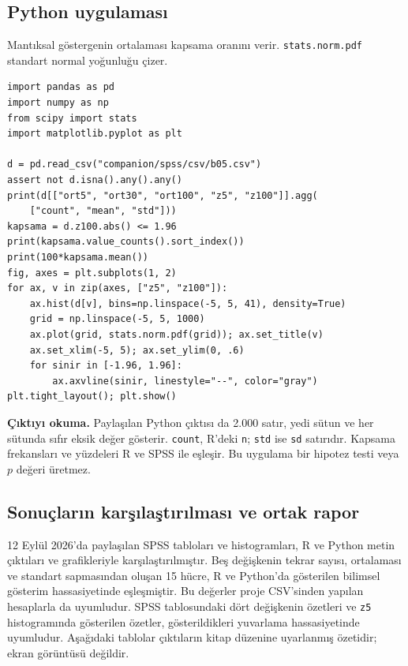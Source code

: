 \par\noindent\begin{minipage}{\linewidth}
\subsection{Python uygulaması}
\label{sec:python-b05}

Mantıksal göstergenin ortalaması kapsama oranını verir. \texttt{stats.norm.pdf} standart normal yoğunluğu çizer.

\begin{lstlisting}[style=prismPythonApp]
import pandas as pd
import numpy as np
from scipy import stats
import matplotlib.pyplot as plt

d = pd.read_csv("companion/spss/csv/b05.csv")
assert not d.isna().any().any()
print(d[["ort5", "ort30", "ort100", "z5", "z100"]].agg(
    ["count", "mean", "std"]))
kapsama = d.z100.abs() <= 1.96
print(kapsama.value_counts().sort_index())
print(100*kapsama.mean())
fig, axes = plt.subplots(1, 2)
for ax, v in zip(axes, ["z5", "z100"]):
    ax.hist(d[v], bins=np.linspace(-5, 5, 41), density=True)
    grid = np.linspace(-5, 5, 1000)
    ax.plot(grid, stats.norm.pdf(grid)); ax.set_title(v)
    ax.set_xlim(-5, 5); ax.set_ylim(0, .6)
    for sinir in [-1.96, 1.96]:
        ax.axvline(sinir, linestyle="--", color="gray")
plt.tight_layout(); plt.show()
\end{lstlisting}

\textbf{Çıktıyı okuma.} Paylaşılan Python çıktısı da 2.000 satır,
yedi sütun ve her sütunda sıfır eksik değer gösterir. \texttt{count},
R'deki \texttt{n}; \texttt{std} ise \texttt{sd} satırıdır. Kapsama
frekansları ve yüzdeleri R ve SPSS ile eşleşir. Bu uygulama bir hipotez
testi veya $p$ değeri üretmez.
\end{minipage}\par

\subsection{Sonuçların karşılaştırılması ve ortak rapor}
12 Eylül 2026'da paylaşılan SPSS tabloları ve histogramları, R ve Python
metin çıktıları ve grafikleriyle karşılaştırılmıştır. Beş değişkenin
tekrar sayısı, ortalaması ve standart sapmasından oluşan 15 hücre,
R ve Python'da gösterilen bilimsel gösterim hassasiyetinde eşleşmiştir.
Bu değerler proje CSV'sinden yapılan hesaplarla da uyumludur. SPSS
tablosundaki dört değişkenin özetleri ve \texttt{z5} histogramında
gösterilen özetler, gösterildikleri yuvarlama hassasiyetinde uyumludur.
Aşağıdaki tablolar çıktıların kitap düzenine uyarlanmış özetidir;
ekran görüntüsü değildir.

